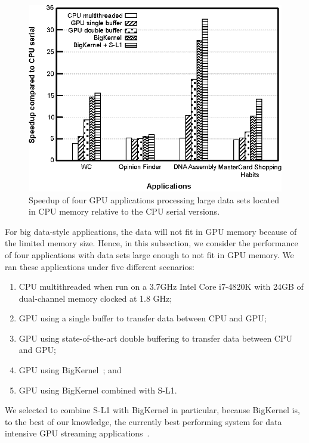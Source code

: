 \begin{figure}[t]
\center
\includegraphics[scale=0.80]{11bigkernelAndSl1.eps}
\vspace{-0.0cm}
\caption{\footnotesize\textnormal{Speedup of four GPU applications processing large data sets located in CPU memory relative to the CPU serial versions.}}
\label{fig:bigkernelandsl1}
\vspace{-0.2cm}
\end{figure}


For big data-style applications, the data will not fit in GPU memory because of the limited memory size. Hence, in this
subsection, we consider the performance of four applications with data sets large enough to not fit in GPU memory. We
ran these applications under five different scenarios:
\begin{enumerate}
\item CPU multithreaded when run on a 3.7GHz Intel Core i7-4820K with 24GB of dual-channel memory clocked at 1.8 GHz;
\item GPU using a single buffer to transfer data between CPU and GPU;
\item GPU using state-of-the-art double buffering to transfer data between CPU and GPU;
\item GPU using BigKernel~\cite{mokhtari2014bigkernel}; and
\item GPU using BigKernel combined with S-L1.
\end{enumerate} 
We selected to combine S-L1 with BigKernel in particular, because BigKernel is,
to the best of our knowledge,
the currently best performing system for data intensive GPU streaming
applications~\cite{mokhtari2014bigkernel}.

